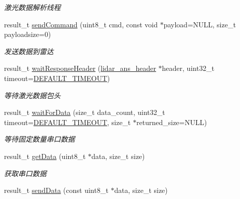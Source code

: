 \begin{DoxyCompactItemize}
\begin{DoxyCompactList}\small\item\em 激光数据解析线程 ~\newline
\end{DoxyCompactList}\item 
result\+\_\+t \hyperlink{classydlidar_1_1_y_dlidar_driver_ab096ecdc3642c04e3e8b000e210c0962}{send\+Command} (uint8\+\_\+t cmd, const void $\ast$payload=N\+U\+LL, size\+\_\+t payloadsize=0)
\begin{DoxyCompactList}\small\item\em 发送数据到雷达 ~\newline
\end{DoxyCompactList}\item 
result\+\_\+t \hyperlink{classydlidar_1_1_y_dlidar_driver_a0e089d615193ccef4bf488f63ff8130e}{wait\+Response\+Header} (\hyperlink{structlidar__ans__header}{lidar\+\_\+ans\+\_\+header} $\ast$header, uint32\+\_\+t timeout=\hyperlink{classydlidar_1_1_y_dlidar_driver_a13a4f2dc4067b43794b2c47c06d5d27aa07c79ce96f468ff4b40495ef84584442}{D\+E\+F\+A\+U\+L\+T\+\_\+\+T\+I\+M\+E\+O\+UT})
\begin{DoxyCompactList}\small\item\em 等待激光数据包头 ~\newline
\end{DoxyCompactList}\item 
result\+\_\+t \hyperlink{classydlidar_1_1_y_dlidar_driver_a13f404b44f51941d1642bfe250de3522}{wait\+For\+Data} (size\+\_\+t data\+\_\+count, uint32\+\_\+t timeout=\hyperlink{classydlidar_1_1_y_dlidar_driver_a13a4f2dc4067b43794b2c47c06d5d27aa07c79ce96f468ff4b40495ef84584442}{D\+E\+F\+A\+U\+L\+T\+\_\+\+T\+I\+M\+E\+O\+UT}, size\+\_\+t $\ast$returned\+\_\+size=N\+U\+LL)
\begin{DoxyCompactList}\small\item\em 等待固定数量串口数据 ~\newline
\end{DoxyCompactList}\item 
result\+\_\+t \hyperlink{classydlidar_1_1_y_dlidar_driver_ad787e714bc05e5a70a42b096e632c60f}{get\+Data} (uint8\+\_\+t $\ast$data, size\+\_\+t size)
\begin{DoxyCompactList}\small\item\em 获取串口数据 ~\newline
\end{DoxyCompactList}\item 
result\+\_\+t \hyperlink{classydlidar_1_1_y_dlidar_driver_a998ba4b05927d19e8a0d4d29d3d47656}{send\+Data} (const uint8\+\_\+t $\ast$data, size\+\_\+t size)

\end{DoxyCompactItemize}
